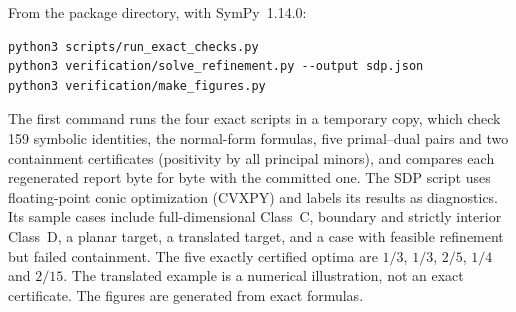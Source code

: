 From the package directory, with SymPy~1.14.0:
\begin{Verbatim}[fontsize=\small]
python3 scripts/run_exact_checks.py
python3 verification/solve_refinement.py --output sdp.json
python3 verification/make_figures.py
\end{Verbatim}
The first command runs the four exact scripts in a temporary copy, which check 159 symbolic identities, the normal-form formulas, five primal--dual pairs and two containment certificates (positivity by all principal minors), and compares each regenerated report byte for byte with the committed one. The SDP script uses floating-point conic optimization (CVXPY) and labels its results as diagnostics. Its sample cases include full-dimensional Class~C, boundary and strictly interior Class~D, a planar target, a translated target, and a case with feasible refinement but failed containment. The five exactly certified optima are $1/3$, $1/3$, $2/5$, $1/4$ and $2/15$. The translated example is a numerical illustration, not an exact certificate. The figures are generated from exact formulas.

